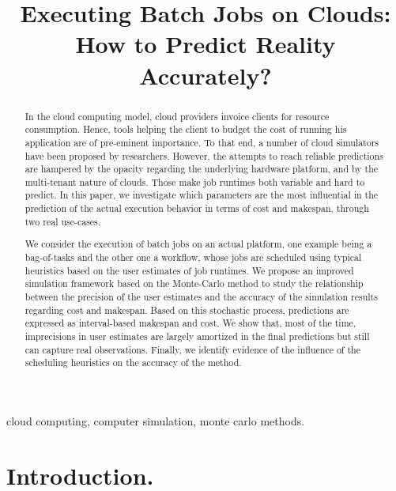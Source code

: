 \documentclass[10pt,conference,compsocconf]{IEEEtran}
\title{Executing Batch Jobs on Clouds: How to Predict Reality Accurately?}
\author{\IEEEauthorblockN{Luke~Bertot 
			and Stéphane~Genaud 
			and Julien~Gossa}
	\IEEEauthorblockA{Icube-ICPS --- UMR 7357, Univeristé de Strasbourg, CNRS\\
		P\^ole API Blvd S. Bant, 67400 Illkirch\\
		email: \url{lbertot@unistra.fr}, \url{genaud@unistra.fr}, \url{gossa@unistra.fr}}
	}
\begin{document}
\maketitle

\begin{abstract}
  In the  cloud computing  model, cloud providers  invoice clients  for resource
  consumption. Hence, tools helping the client to budget the cost of running his
  application are  of pre-eminent  importance. To  that end,  a number  of cloud
  simulators have been  proposed by researchers. However, the  attempts to reach
  reliable  predictions are  hampered by  the opacity  regarding the  underlying
  hardware platform, and by the  multi-tenant nature of clouds. Those make job
  runtimes both  variable and hard to  predict.  In this paper,  we investigate
  which parameters are the most  influential in the
  prediction of the actual execution behavior in terms of cost and makespan,
  through two real  use-cases.

  We consider the execution  of batch jobs on an  actual platform, one example
  being a  bag-of-tasks and the other  one a workflow, whose  jobs are scheduled
  using typical  heuristics based on  the user  estimates of job  runtimes.  We
  propose an  improved simulation framework  based on the Monte-Carlo  method to
  study the  relationship between the  precision of  the user estimates  and the
  accuracy of the simulation results regarding  cost and makespan. Based on this
  stochastic process,  predictions are expressed as  interval-based makespan and
  cost.   We show  that, most  of the time, imprecisions  in  user estimates are
  largely amortized in the final predictions but still can capture real
  observations. Finally, we identify evidence of the influence of the scheduling 
  heuristics on the accuracy of the method.
\end{abstract}

\begin{IEEEkeywords}
cloud computing, computer simulation, monte carlo methods.
\end{IEEEkeywords}


\section{Introduction.}
\end{document}
